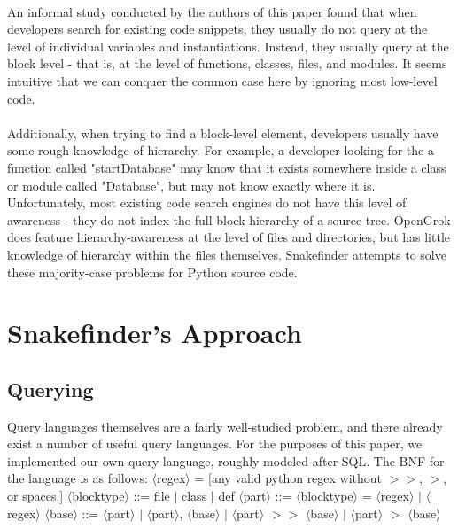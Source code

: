 \documentclass{article}
\begin{document}
\paragraph{}
An informal study conducted by the authors of this paper found that when developers search for existing code snippets, they usually do not query at the level of individual variables and instantiations. Instead, they usually query at the block level - that is, at the level of functions, classes, files, and modules. It seems intuitive that we can conquer the common case here by ignoring most low-level code.

\paragraph{}
Additionally, when trying to find a block-level element, developers usually have some rough knowledge of hierarchy. For example, a developer looking for the a function called "startDatabase" may know that it exists somewhere inside a class or module called "Database", but may not know exactly where it is. Unfortunately, most existing code search engines do not have this level of awareness - they do not index the full block hierarchy of a source tree. OpenGrok does feature hierarchy-awareness at the level of files and directories, but has little knowledge of hierarchy within the files themselves. Snakefinder attempts to solve these majority-case problems for Python source code.

\section{Snakefinder's Approach}
\subsection{Querying}
Query languages themselves are a fairly well-studied problem, and there already exist a number of useful query languages. For the purposes of this paper, we implemented our own query language, roughly modeled after SQL. The BNF for the language is as follows:\newline
\newline
$\langle$regex$\rangle$ = [any valid python regex without $>>$, $>$, or spaces.]
\newline
$\langle$blocktype$\rangle$ ::= file $|$ class $|$ def
\newline
$\langle$part$\rangle$ ::= $\langle$blocktype$\rangle$ = $\langle$regex$\rangle$ $|$ $\langle$regex$\rangle$
\newline
$\langle$base$\rangle$ ::= $\langle$part$\rangle$ $|$ $\langle$part$\rangle$, $\langle$base$\rangle$ $|$ $\langle$part$\rangle$ $>>$ $\langle$base$\rangle$ $|$ $\langle$part$\rangle$ $>$ $\langle$base$\rangle$
\newline
\end{document}
